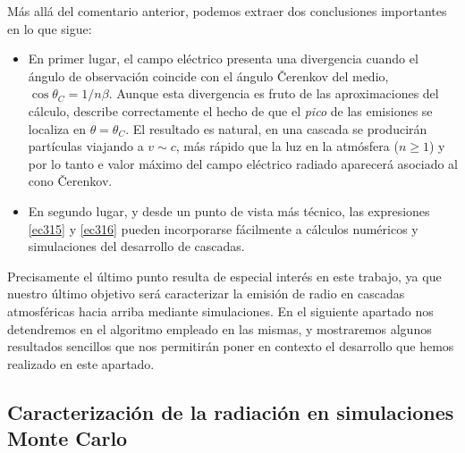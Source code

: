 \documentclass[12 pt, a4paper]{article} %
\numberwithin{equation}{section}
\numberwithin{figure}{section}
\begin{document}
Más allá del comentario anterior, podemos extraer dos conclusiones importantes en lo que sigue:
\begin{itemize}
	\item En primer lugar, el campo eléctrico presenta una divergencia cuando el ángulo de observación coincide con el ángulo \v{C}erenkov del medio, $\cos{\theta_C}=1/n\beta$. Aunque esta divergencia es fruto de las aproximaciones del cálculo, describe correctamente el hecho de que el \textit{pico} de las emisiones se localiza en $\theta=\theta_C$. El resultado es natural, en una cascada se producirán partículas viajando a $v\sim c$, más rápido que la luz en la atmósfera ($n\geq 1$) y por lo tanto e valor máximo del campo eléctrico radiado aparecerá asociado al cono \v{C}erenkov.
	\item En segundo lugar, y desde un punto de vista más técnico, las expresiones \eqref{ec315} y \eqref{ec316} pueden incorporarse fácilmente a cálculos numéricos y simulaciones del desarrollo de cascadas.
\end{itemize}

Precisamente el último punto resulta de especial interés en este trabajo, ya que nuestro último objetivo será caracterizar la emisión de radio en cascadas atmosféricas hacia arriba mediante simulaciones. En el siguiente apartado nos detendremos en el algoritmo empleado en las mismas, y mostraremos algunos resultados sencillos que nos permitirán poner en contexto el desarrollo que hemos realizado en este apartado.

	\subsection{Caracterización de la radiación en simulaciones Monte Carlo}\label{sec32}
\end{document}
